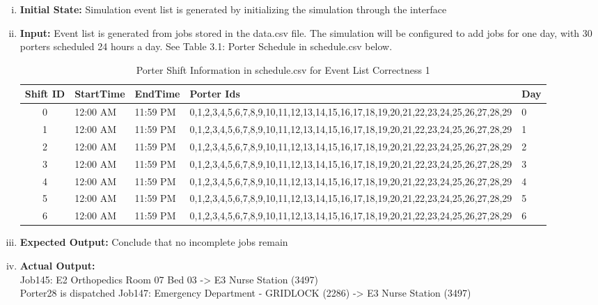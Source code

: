 \documentclass[paper=letter, fontsize=10pt]{scrartcl}
\numberwithin{equation}{section}		%
\numberwithin{figure}{section}			%
\numberwithin{table}{section}				%
\begin{document}
\begin{enumerate}[(i)]
	\item \textbf{Initial State:} Simulation event list is generated by initializing the simulation through the interface
	\item \textbf{Input:} Event list is generated from jobs stored in the data.csv file. The simulation will be configured to add jobs for one day, with 30 porters scheduled 24 hours a day. See Table 3.1: Porter Schedule in schedule.csv below.
	\begin{table}
	\caption{Porter Shift Information in schedule.csv for Event List Correctness 1}
	\begin{center}
    	\begin{tabular}{| c | l | l | l | l |}
    		\hline
        	Shift ID & StartTime & EndTime & Porter Ids & Day \\ \hline
  			0 & 12:00 AM & 11:59 PM & 0,1,2,3,4,5,6,7,8,9,10,11,12,13,14,15,16,17,18,19,20,21,22,23,24,25,26,27,28,29 & 0 \\ \hline
  			1 & 12:00 AM & 11:59 PM & 0,1,2,3,4,5,6,7,8,9,10,11,12,13,14,15,16,17,18,19,20,21,22,23,24,25,26,27,28,29 & 1 \\ \hline
  			2 & 12:00 AM & 11:59 PM & 0,1,2,3,4,5,6,7,8,9,10,11,12,13,14,15,16,17,18,19,20,21,22,23,24,25,26,27,28,29 & 2 \\ \hline
  			3 & 12:00 AM & 11:59 PM & 0,1,2,3,4,5,6,7,8,9,10,11,12,13,14,15,16,17,18,19,20,21,22,23,24,25,26,27,28,29 & 3 \\ \hline
  			4 & 12:00 AM & 11:59 PM & 0,1,2,3,4,5,6,7,8,9,10,11,12,13,14,15,16,17,18,19,20,21,22,23,24,25,26,27,28,29 & 4 \\ \hline
  			5 & 12:00 AM & 11:59 PM & 0,1,2,3,4,5,6,7,8,9,10,11,12,13,14,15,16,17,18,19,20,21,22,23,24,25,26,27,28,29 & 5 \\ \hline
  			6 & 12:00 AM & 11:59 PM & 0,1,2,3,4,5,6,7,8,9,10,11,12,13,14,15,16,17,18,19,20,21,22,23,24,25,26,27,28,29 & 6 \\ \hline
    	\end{tabular}
	\end{center}
	\end{table}
	\item \textbf{Expected Output:} Conclude that no incomplete jobs remain
	\item \textbf{Actual Output:} \\
	Job145: E2 Orthopedics Room 07 Bed 03 -> E3 Nurse Station (3497) \\
Porter28 is dispatched Job147: Emergency Department - GRIDLOCK (2286) -> E3 Nurse Station (3497) \\

\end{enumerate}
\end{document}
